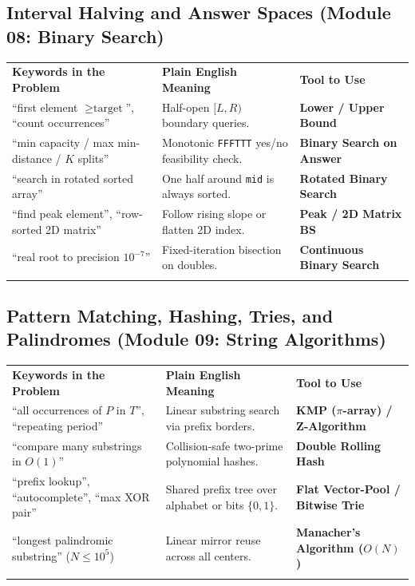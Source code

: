 \documentclass[11pt,a4paper]{article}
\begin{document}
\subsection{Interval Halving and Answer Spaces (Module 08: Binary Search)}
\begingroup\footnotesize{}
\begin{tabularx}{\textwidth}{>{\raggedright\arraybackslash}p{4.4cm} >{\raggedright\arraybackslash}X >{\raggedright\arraybackslash\bfseries}p{4.0cm}}
\arrayrulecolor{primaryblue}\toprule[1.1pt]
\rowcolor{primaryblue!10}
\textcolor{primaryblue}{\textbf{Keywords in the Problem}} & \textcolor{primaryblue}{\textbf{Plain English Meaning}} & \textcolor{primaryblue}{\textbf{Tool to Use}} \\
\arrayrulecolor{codeframe}\midrule[0.6pt]
``first element $\ge \text{target}$'', ``count occurrences'' & Half-open $[L, R)$ boundary queries. & Lower / Upper Bound \\
``min capacity / max min-distance / $K$ splits'' & Monotonic \texttt{FFFTTT} yes/no feasibility check. & Binary Search on Answer \\
``search in rotated sorted array'' & One half around \texttt{mid} is always sorted. & Rotated Binary Search \\
``find peak element'', ``row-sorted 2D matrix'' & Follow rising slope or flatten 2D index. & Peak / 2D Matrix BS \\
``real root to precision $10^{-7}$'' & Fixed-iteration bisection on doubles. & Continuous Binary Search \\
\arrayrulecolor{primaryblue}\bottomrule[1.1pt]
\end{tabularx}\endgroup

\subsection{Pattern Matching, Hashing, Tries, and Palindromes (Module 09: String Algorithms)}
\begingroup\footnotesize{}
\begin{tabularx}{\textwidth}{>{\raggedright\arraybackslash}p{4.4cm} >{\raggedright\arraybackslash}X >{\raggedright\arraybackslash\bfseries}p{4.0cm}}
\arrayrulecolor{primaryblue}\toprule[1.1pt]
\rowcolor{primaryblue!10}
\textcolor{primaryblue}{\textbf{Keywords in the Problem}} & \textcolor{primaryblue}{\textbf{Plain English Meaning}} & \textcolor{primaryblue}{\textbf{Tool to Use}} \\
\arrayrulecolor{codeframe}\midrule[0.6pt]
``all occurrences of $P$ in $T$'', ``repeating period'' & Linear substring search via prefix borders. & KMP ($\pi$-array) / Z-Algorithm \\
``compare many substrings in $O(1)$'' & Collision-safe two-prime polynomial hashes. & Double Rolling Hash \\
``prefix lookup'', ``autocomplete'', ``max XOR pair'' & Shared prefix tree over alphabet or bits $\{0, 1\}$. & Flat Vector-Pool / Bitwise Trie \\
``longest palindromic substring'' ($N \le 10^5$) & Linear mirror reuse across all centers. & Manacher's Algorithm ($O(N)$) \\
\arrayrulecolor{primaryblue}\bottomrule[1.1pt]
\end{tabularx}\endgroup
\end{document}
